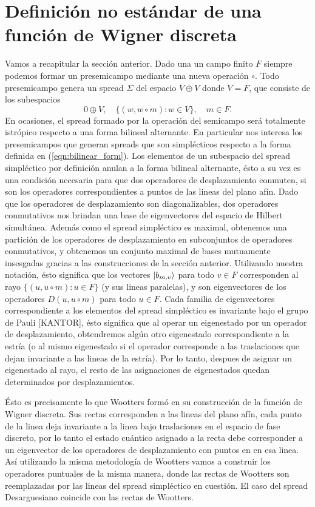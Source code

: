 \documentclass[a4paper]{report}
\begin{document}
  \newpage
  \section{Definición no estándar de una función de Wigner
  discreta}

  Vamos a recapitular la sección anterior. Dado una un campo
  finito $F$ siempre podemos formar un presemicampo mediante
  una nueva operación $\circ$. Todo presemicampo genera un
  spread $\Sigma$ del espacio $V \oplus V$ donde $V = F$, que
  consiste de los subespacios
  \[
    0 \oplus V,
    \quad
    \{(w, w \circ m) : w \in V\}, 
    \quad m \in F.
  \] 
  En ocasiones, el spread formado por la operación del
  semicampo será totalmente istrópico respecto a una forma
  bilineal alternante. En particular nos interesa los
  presemicampos que generan spreads que son simplécticos
  respecto a la forma definida en (\ref{eqn:bilinear_form}).
  Los elementos de un subespacio del spread simpléctico por
  definición anulan a la forma bilineal alternante, ésto a
  su vez es una condición necesaria para que dos operadores
  de desplazamiento conmuten, si son los operadores
  correspondientes a puntos de las lineas del plano afín.
  Dado que los operadores de desplazamiento son
  diagonalizables, dos operadores conmutativos nos brindan
  una base de eigenvectores del espacio de Hilbert
  simultánea. Además como el spread simpléctico es maximal,
  obtenemos una partición de los operadores de
  desplazamiento en subconjuntos de operadores conmutativos,
  y obtenemos un conjunto maximal de bases mutuamente
  insesgadas gracias a las construcciones de la sección
  anterior. Utilizando nuestra notación, ésto significa que
  los vectores $\ket{b_{m,v}}$ para todo $v \in F$
  corresponden al rayo $\{(u, u \circ m) : u \in F\}$ (y sus
  lineas paralelas), y son eigenvectores de los operadores
  $D(u, u \circ m)$ para todo $u \in F$. Cada familia de
  eigenvectores correspondiente a los elementos del spread
  simpléctico es invariante bajo el grupo de Pauli [KANTOR],
  ésto significa que al operar un eigenestado por un
  operador de desplazamiento, obtendremos algún otro
  eigenestado correspondiente a la estría (o al mismo
  eigenestado si el operador corresponde a las traslaciones
  que dejan invariante a las lineas de la estría). Por lo
  tanto, despues de asignar un eigenestado al rayo, el resto
  de las asignaciones de eigenestados quedan determinados
  por desplazamientos.

  Ésto es precisamente lo que Wootters formó en su
  construcción de la función de Wigner discreta. Sus rectas
  corresponden a las lineas del plano afín, cada punto de la
  linea deja invariante a la linea bajo traslaciones en el
  espacio de fase discreto, por lo tanto el estado cuántico
  asignado a la recta debe corresponder a un eigenvector de
  los operadores de desplazamiento con puntos en en esa
  linea. Así utilizando la misma metodología de
  Wootters vamos a construir los operadores puntuales de la
  misma manera, donde las rectas de Wootters son
  reemplazadas por las lineas del spread simpléctico en
  cuestión. El caso del spread Desarguesiano coincide con
  las rectas de Wootters.
\end{document}

